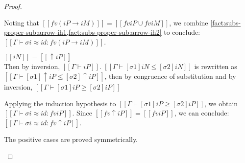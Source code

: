 \begin{proof}
\begin{caseof}
    Noting that $[[fv (iP → iM)]] = [[fv iP ∪ fv iM]]$,
    we combine
    \cref{fact:subs-proper-sub:arrow-ih1,fact:subs-proper-sub:arrow-ih2}
    to conclude:
    $[[Γ ⊢ σi ≈ id :  fv (iP → iM)]]$.

  \item $[[iN]] = [[↑iP]]$\\
    Then by inversion, $[[Γ ⊢ iP]]$.
    $[[Γ ⊢ [σ1]iN ≤ [σ2]iN]]$ is rewritten as
    $[[Γ ⊢ [σ1]↑iP ≤ [σ2]↑iP]]$,
    then by congruence of substitution and by inversion,
    $[[Γ ⊢ [σ1]iP ≥ [σ2]iP]]$

    Applying the induction hypothesis to $[[Γ ⊢ [σ1]iP ≥ [σ2]iP]]$, we obtain
    $[[Γ ⊢ σi ≈ id :  fv iP]]$. Since $[[fv ↑iP]] = [[fv iP]]$, we can
    conclude: $[[Γ ⊢ σi ≈ id :  fv ↑iP]]$.
  \item The positive cases are proved symmetrically.
  \end{caseof}
\end{proof}

\corollarySubstProperSubt*


